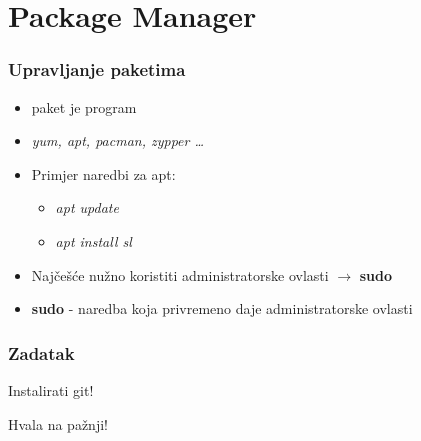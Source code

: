 \documentclass{beamer}
\begin{document}
\section{Package Manager}
\begin{frame}[t]
\frametitle{Upravljanje paketima}
\begin{itemize}
  \item paket je program
  \item \textit{yum, apt, pacman, zypper \ldots}
  \item Primjer naredbi za apt:
  \begin{itemize}
    \item  \textit{apt update}
  \item \textit{apt install sl}
  \end{itemize}
  \item Najčešće nužno koristiti administratorske ovlasti $\rightarrow$ \textbf{sudo}
  \item \textbf{sudo} - naredba koja privremeno daje administratorske ovlasti
\end{itemize}
\end{frame}

\begin{frame}[c]
\frametitle{Zadatak}
  \begin{center}
    \begin{huge}
    Instalirati git!
    \end{huge}
  \end{center}
\end{frame}

\begin{frame}[c]
  \begin{center}
    \begin{large}
    Hvala na pažnji!
    \end{large}
  \end{center}
\end{frame}
\end{document}

